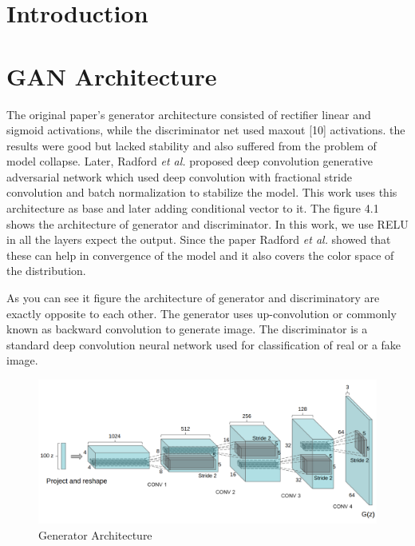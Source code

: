 
\section{Introduction}

\section{GAN Architecture} 

The original paper's\cite{Original-GAN} generator architecture consisted of  rectifier linear\cite{RELU} and sigmoid activations, while the discriminator net used maxout [10] activations. the results were good but lacked stability and also suffered from the problem of model collapse.
Later, Radford \textit{et al.}\cite{DCGAN} proposed deep convolution generative adversarial network which used deep convolution with fractional stride convolution and batch normalization to stabilize the model. This work uses this architecture as base and later adding conditional vector to it. The figure 4.1 shows the architecture of generator and discriminator. In this work, we use RELU
in all the layers expect the output. Since the paper Radford \textit{et al.}\cite{DCGAN} showed that these can help in convergence of the model and it also covers the color space of the distribution.
\par

As you can see it figure the architecture of generator and discriminatory are exactly opposite to each other. The generator uses up-convolution or commonly known as backward convolution to generate image.%
The discriminator is a standard deep convolution neural network used for classification of real or  a fake image.
\begin{figure}
  \centering
    \includegraphics[scale=.7, angle=0]{Files/Generator-Architecture.png}
    \caption[Generator Architecture]{Generator Architecture\cite{DCGAN}}
    \label{fig: DCGAN}
\end{figure}

